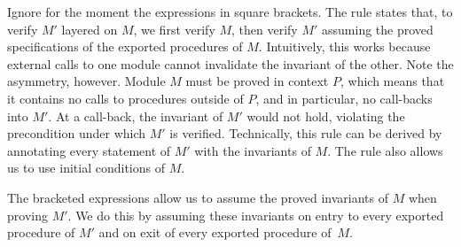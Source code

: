 Ignore for the moment the expressions in square brackets. The rule states that,
to verify $M'$ layered on $M$, we first verify $M$,
then verify $M'$ assuming the proved specifications of the
exported procedures of $M$. Intuitively, this works because external calls
to one module cannot invalidate the invariant of the other. Note the asymmetry, however.
Module $M$ must be proved in context $P$, which means that it
contains no calls to procedures outside of $P$, and in particular, no call-backs
into $M'$. At a call-back, the invariant of $M'$ would not hold, violating the
precondition under which $M'$ is verified. Technically, this rule can be derived by
annotating every statement of $M'$ with the invariants of $M$. The rule also allows us to
use initial conditions of $M$.

The bracketed expressions allow us to assume the proved invariants of
$M$ when proving $M'$.  We do this by assuming these invariants on entry
to every exported procedure of $M'$ and on exit of every exported
procedure of~$M$.





